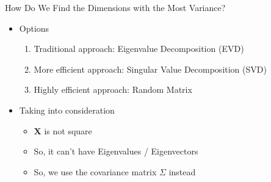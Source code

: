 \documentclass[aspectratio=169]{beamer}
\begin{document}
%
%
%
%
\begin{frame}{How Do We Find the Dimensions with the Most Variance?}

\begin{itemize}
\item Options
\begin{enumerate}
\item Traditional approach: Eigenvalue Decomposition (EVD)
\item More efficient approach: Singular Value Decomposition (SVD)
\item Highly efficient approach: Random Matrix
\end{enumerate}
\item Taking into consideration
\begin{itemize}
\item $\textbf{X}$ is not square
\item So, it can't have Eigenvalues / Eigenvectors
\item So, we use the covariance matrix $\Sigma$ instead
\end{itemize}
\end{itemize}
\end{frame}
\end{document}
